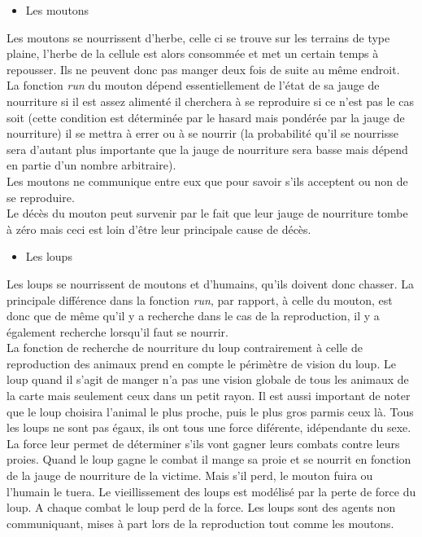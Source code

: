 \documentclass[12pt]{article}
\begin{document}
		\begin{itemize}
		\item Les moutons\\
		\end{itemize}

Les moutons se nourrissent d'herbe, celle ci se trouve sur les terrains de type
plaine, l'herbe de la cellule est alors consommée et met un certain temps à
repousser. Ils ne peuvent donc pas manger deux fois de suite au même endroit.\\

La fonction \textit{run} du mouton dépend essentiellement de l'état de sa
jauge de nourriture si il est assez alimenté il cherchera à se reproduire
si ce n'est pas le cas soit (cette condition est déterminée par le hasard mais
pondérée par la jauge de nourriture) il se mettra à errer ou à se nourrir (la
probabilité qu'il se nourrisse sera d'autant plus importante que la jauge de
nourriture sera basse mais dépend en partie d'un nombre arbitraire).\\

Les moutons ne communique entre eux que pour savoir s'ils acceptent ou non de 
se reproduire.\\

Le décès du mouton peut survenir par le fait que leur jauge de nourriture 
tombe à zéro mais ceci est loin d'être leur principale cause de décès.\\

		\begin{itemize}
		\item Les loups\\
		\end{itemize}

Les loups se nourrissent de moutons et d'humains, qu'ils doivent donc chasser. La 
principale différence dans la fonction \textit{run}, par rapport, à celle du 
mouton, est donc que de même qu'il y a recherche dans le cas de la 
reproduction, il y a également recherche lorsqu'il faut se nourrir.\\

La fonction de recherche de nourriture du loup contrairement à celle de 
reproduction des animaux prend en compte le périmètre de vision du loup. Le 
loup quand il s'agit de manger n'a pas une vision globale de tous les animaux 
de la carte mais seulement ceux dans un petit rayon. Il est aussi important de 
noter que le loup choisira l'animal le plus proche, puis le plus gros parmis 
ceux là. Tous les loups ne sont pas égaux, ils ont tous une force diférente, 
idépendante du sexe. La force leur permet de déterminer s'ils vont gagner 
leurs combats contre leurs proies. Quand le loup gagne le combat il mange sa 
proie et se nourrit en fonction de la jauge de nourriture de la victime. Mais 
s'il perd, le mouton fuira ou l'humain le tuera. Le vieillissement des loups 
est modélisé par la perte de force du loup. A chaque combat le loup perd de la 
force. Les loups sont des agents non communiquant, mises à part lors de la 
reproduction tout comme les moutons.\\
\end{document}
